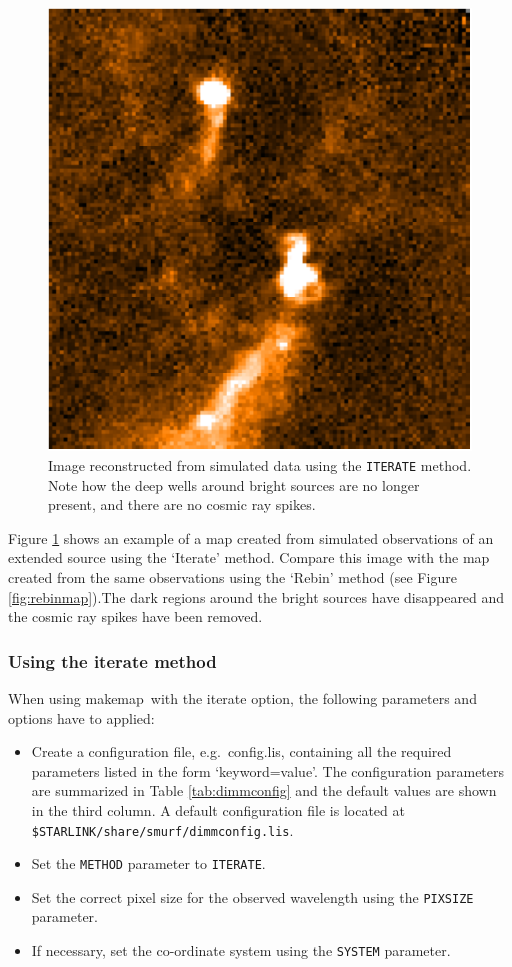 \documentclass[twoside,11pt]{article}
\newcommand{\xref}[3]{#1}
\renewcommand{\_}{\texttt{\symbol{95}}}
\newcommand{\task}[1]{\textsf{#1}}
\newcommand{\makemap}{\xref{\task{makemap}}{sun258}{MAKEMAP}}
\newcommand{\aparam}[1]{\texttt{#1}}     %
\begin{document}
\begin{figure}[htb]
  \begin{center}
    \includegraphics[width=0.7\linewidth]{sun258_itermap}
    \caption{Image reconstructed from simulated data using the
      \aparam{ITERATE} method. Note how the deep wells around bright
      sources are no longer present, and there are no cosmic ray
      spikes.}
    \label{fig:itermap}
  \end{center}
\end{figure}

Figure \ref{fig:itermap} shows an example of a map created from
simulated observations of an extended source using the `Iterate'
method. Compare this image with the map created from the same
observations using the `Rebin' method (see Figure
\ref{fig:rebinmap}).The dark regions around the bright sources have
disappeared and the cosmic ray spikes have been removed.


\subsubsection{Using the iterate method}

When using \makemap\ with the iterate option, the following parameters
and options have to applied:

\begin{itemize}
\item Create a configuration file, e.g.\ config.lis, containing all the
  required parameters listed in the form `keyword=value'. The
  configuration parameters are summarized in Table \ref{tab:dimmconfig}
  and the default values are shown in the third column. A default
  configuration file is located at
  \texttt{\$STARLINK/share/smurf/dimmconfig.lis}.
\item Set the \aparam{METHOD} parameter to \aparam{ITERATE}.
\item Set the correct pixel size for the observed wavelength using the
  \aparam{PIXSIZE} parameter.
\item If necessary, set the co-ordinate system using the \aparam{SYSTEM}
  parameter.
\end{itemize}
\end{document}

